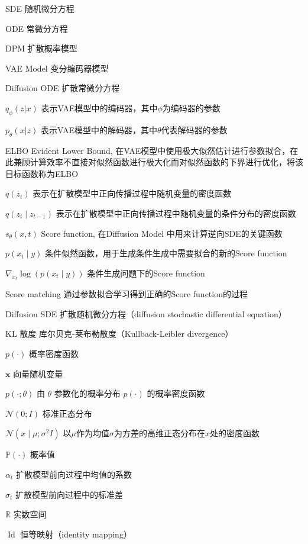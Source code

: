 
\begin{denotation}[3cm]
\item[SDE] 随机微分方程
\item[ODE] 常微分方程
\item[DPM] 扩散概率模型
\item[VAE Model] 变分编码器模型
\item[Diffusion ODE] 扩散常微分方程
  \item[$q_{\phi}(z|x)$] 表示VAE模型中的编码器，其中$\phi$为编码器的参数
  \item [$p_{\theta}(x|z)$] 表示VAE模型中的解码器，其中$\theta$代表解码器的参数
  \item [ELBO] Evident Lower Bound, 在VAE模型中使用极大似然估计进行参数拟合，在此兼顾计算效率不直接对似然函数进行极大化而对似然函数的下界进行优化，将该目标函数称为ELBO
  \item [$q(z_t)$]表示在扩散模型中正向传播过程中随机变量的密度函数
  \item [$q(z_t\mid z_{t-1})$] 表示在扩散模型中正向传播过程中随机变量的条件分布的密度函数
  \item [$s_{\theta}(x,t)$] Score function, 在Diffusion Model 中用来计算逆向SDE的关键函数
  \item [$p({x}_t\mid y)$] 条件似然函数，用于生成条件生成中需要拟合的新的Score function
  \item [$\nabla_{{x}_t}\log\left(p({x}_t\mid y)\right)$] 条件生成问题下的Score function
  \item [Score matching] 通过参数拟合学习得到正确的Score function的过程

  \item [Diffusion SDE] 扩散随机微分方程（diffusion stochastic differential equation）

  \item [KL 散度] 库尔贝克-莱布勒散度（Kullback-Leibler divergence）
  \item [$p(\cdot)$] 概率密度函数
  \item [$\boldsymbol{x}$] 向量随机变量
  \item [$p(\cdot;\theta)$] 由 $\theta$ 参数化的概率分布 $p(\cdot)$ 的概率密度函数

  \item[$\mathcal{N}(0;I)$] 标准正态分布
  \item[$\mathcal{N}(x\mid \mu;\sigma^2 I)$] 以$\mu$作为均值$\sigma$为方差的高维正态分布在$x$处的密度函数
  \item [$\mathbb{P}(\cdot)$] 概率值
  \item [$\alpha_t$] 扩散模型前向过程中均值的系数
  \item [$\sigma_t$] 扩散模型前向过程中的标准差
  \item [$\mathbb{R}$] 实数空间
  \item [$\operatorname{Id}$] 恒等映射（identity mapping）


\end{denotation}
